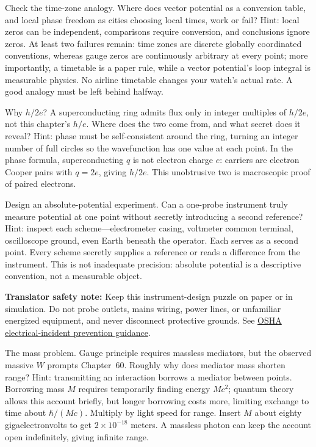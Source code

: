 \begin{puzzles}
\item Check the time-zone analogy. Where does vector potential as a conversion table, and local phase freedom as cities choosing local times, work or fail? Hint: local zeros can be independent, comparisons require conversion, and conclusions ignore zeros. At least two failures remain: time zones are discrete globally coordinated conventions, whereas gauge zeros are continuously arbitrary at every point; more importantly, a timetable is a paper rule, while a vector potential's loop integral is measurable physics. No airline timetable changes your watch's actual rate. A good analogy must be left behind halfway.
\item Why \(h/2e\)? A superconducting ring admits flux only in integer multiples of \(h/2e\), not this chapter's \(h/e\). Where does the two come from, and what secret does it reveal? Hint: phase must be self-consistent around the ring, turning an integer number of full circles so the wavefunction has one value at each point. In the phase formula, superconducting \(q\) is not electron charge \(e\): carriers are electron Cooper pairs with \(q=2e\), giving \(h/2e\). This unobtrusive two is macroscopic proof of paired electrons.
\item Design an absolute-potential experiment. Can a one-probe instrument truly measure potential at one point without secretly introducing a second reference? Hint: inspect each scheme---electrometer casing, voltmeter common terminal, oscilloscope ground, even Earth beneath the operator. Each serves as a second point. Every scheme secretly supplies a reference or reads a difference from the instrument. This is not inadequate precision: absolute potential is a descriptive convention, not a measurable object.

\textbf{Translator safety note:} Keep this instrument-design puzzle on paper or in simulation. Do not probe outlets, mains wiring, power lines, or unfamiliar energized equipment, and never disconnect protective grounds. See \href{https://www.osha.gov/etools/construction/electrical-incidents/}{OSHA electrical-incident prevention guidance}.

\item The mass problem. Gauge principle requires massless mediators, but the observed massive \(W\) prompts Chapter~60. Roughly why does mediator mass shorten range? Hint: transmitting an interaction borrows a mediator between points. Borrowing mass \(M\) requires temporarily finding energy \(Mc^{2}\); quantum theory allows this account briefly, but longer borrowing costs more, limiting exchange to time about \(\hbar/(Mc)\). Multiply by light speed for range. Insert \(M\) about eighty gigaelectronvolts to get \(2\times10^{-18}\) meters. A massless photon can keep the account open indefinitely, giving infinite range.
\end{puzzles}

